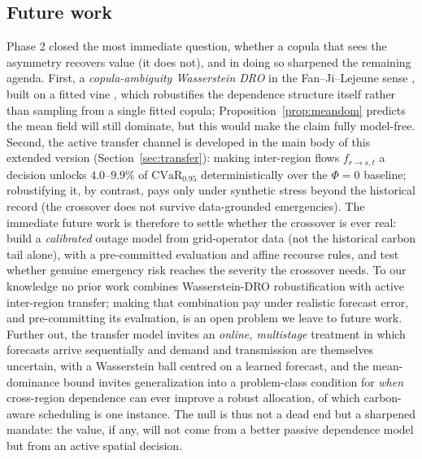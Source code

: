 \documentclass[12pt]{article}
\newcommand{\CVaR}{\mathrm{CVaR}}
\begin{document}
\subsection{Future work}
Phase 2 closed the most immediate question, whether a copula that sees the
asymmetry recovers value (it does not), and in doing so sharpened the remaining
agenda. First, a \emph{copula-ambiguity Wasserstein DRO} in the Fan--Ji--Lejeune
sense \citep{fan2024}, built on a fitted vine \citep{aas2009,dissmann2013}, which
robustifies the dependence structure itself rather than sampling from a single
fitted copula; Proposition~\ref{prop:meandom} predicts the mean field will still
dominate, but this would make the claim fully model-free.
Second, the active transfer channel is developed in the main body of this extended
version (Section~\ref{sec:transfer}): making inter-region flows $f_{r\to s,t}$ a
decision unlocks $4.0$--$9.9\%$ of $\CVaR_{0.95}$ deterministically over the $\Phi=0$
baseline; robustifying it, by contrast, pays only under synthetic stress beyond the
historical record (the crossover does not survive data-grounded emergencies). The
immediate future work is therefore to settle whether the crossover is ever real: build
a \emph{calibrated} outage model from grid-operator data (not the historical carbon
tail alone), with a pre-committed evaluation and affine recourse rules, and test
whether genuine emergency risk reaches the severity the crossover needs. To our
knowledge no prior work combines Wasserstein-DRO robustification with active
inter-region transfer; making that combination pay under realistic forecast error,
and pre-committing its evaluation, is an open problem we leave to future work.
Further
out, the transfer model invites an \emph{online, multistage} treatment in which
forecasts arrive sequentially and demand and transmission are themselves uncertain,
with a Wasserstein ball centred on a learned forecast, and the mean-dominance bound
invites generalization into a problem-class condition for \emph{when} cross-region
dependence can ever improve a robust allocation, of which carbon-aware scheduling is
one instance. The null is thus not a dead end but a sharpened mandate: the value, if
any, will not come from a better passive dependence model but from an active spatial
decision.
\end{document}
